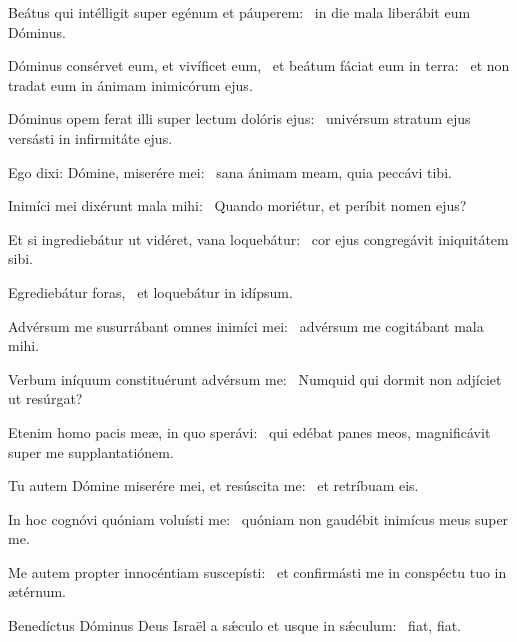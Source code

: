 \item Beátus qui intélligit super egénum et páuperem:~\psstar{} in die mala liberábit eum Dóminus.

\item Dóminus consérvet eum, et vivíficet eum,~\pscross{} et beátum fáciat eum in terra:~\psstar{} et non tradat eum in ánimam inimicórum ejus.

\item Dóminus opem ferat illi super lectum dolóris ejus:~\psstar{} univérsum stratum ejus versásti in infirmitáte ejus.

\item Ego dixi: Dómine, miserére mei:~\psstar{} sana ánimam meam, quia peccávi tibi.

\item Inimíci mei dixérunt mala mihi:~\psstar{} Quando moriétur, et períbit nomen ejus?

\item Et si ingrediebátur ut vidéret, vana loquebátur:~\psstar{} cor ejus congregávit iniquitátem sibi.

\item Egrediebátur foras,~\psstar{} et loquebátur in idípsum.

\item Advérsum me susurrábant omnes inimíci mei:~\psstar{} advérsum me cogitábant mala mihi.

\item Verbum iníquum constituérunt advérsum me:~\psstar{} Numquid qui dormit non adjíciet ut resúrgat?

\item Etenim homo pacis meæ, in quo sperávi:~\psstar{} qui edébat panes meos, magnificávit super me supplantatiónem.

\item Tu autem Dómine miserére mei, et resúscita me:~\psstar{} et retríbuam eis.

\item In hoc cognóvi quóniam voluísti me:~\psstar{} quóniam non gaudébit inimícus meus super me.

\item Me autem propter innocéntiam suscepísti:~\psstar{} et confirmásti me in conspéctu tuo in ætérnum.

\item Benedíctus Dóminus Deus Israël a sǽculo et usque in sǽculum:~\psstar{} fiat, fiat.

